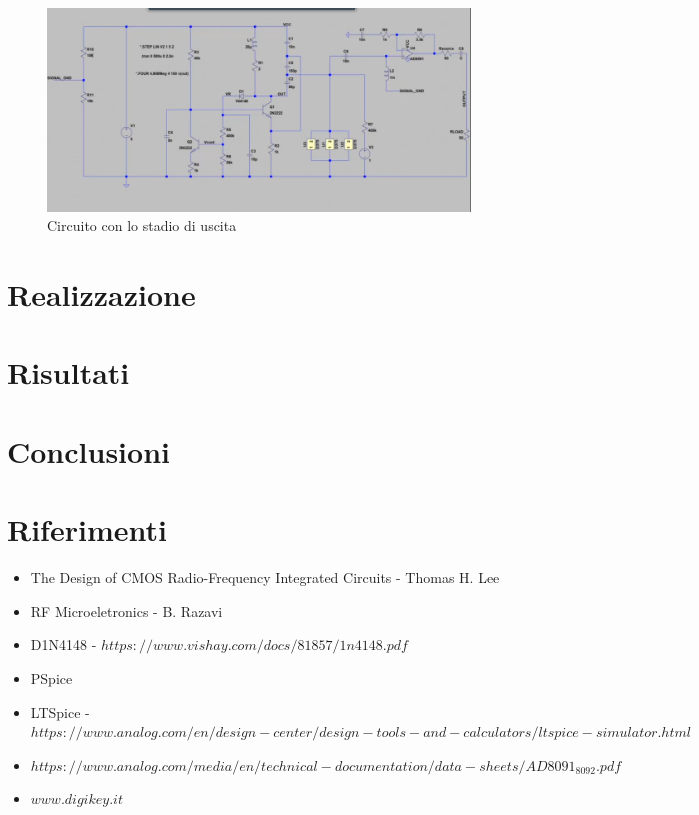 \documentclass{article}
\begin{document}
~\begin{figure}[H]
\includegraphics[width=\textwidth]{CircuitoConBuffer}
\centering
\caption{Circuito con lo stadio di uscita}
\label{fig:foo}
\end{figure}

\newpage
\section{Realizzazione}

\newpage
\section{Risultati}

\newpage

\section{Conclusioni}

\newpage
\section{Riferimenti}

\begin{itemize}
\item The Design of CMOS Radio-Frequency Integrated Circuits - Thomas H. Lee
\item RF Microeletronics - B. Razavi
\item D1N4148 - $https://www.vishay.com/docs/81857/1n4148.pdf$
\item PSpice
\item LTSpice - $https://www.analog.com/en/design-center/design-tools-and-calculators/ltspice-simulator.html$
\item $https://www.analog.com/media/en/technical-documentation/data-sheets/AD8091_8092.pdf$
\item $www.digikey.it$
\end{itemize}
\end{document}
